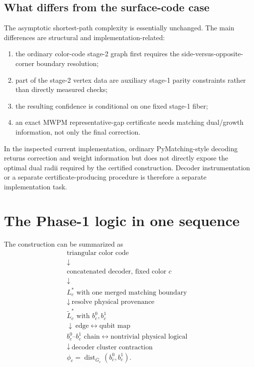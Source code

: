 \documentclass[11pt]{article}
\newcommand{\dist}{\operatorname{dist}}
\begin{document}
\subsection{What differs from the surface-code case}

The asymptotic shortest-path complexity is essentially unchanged. The main
differences are structural and implementation-related:
\begin{enumerate}
  \item the ordinary color-code stage-2 graph first requires the
        side-versus-opposite-corner boundary resolution;
  \item part of the stage-2 vertex data are auxiliary stage-1 parity
        constraints rather than directly measured checks;
  \item the resulting confidence is conditional on one fixed stage-1 fiber;
  \item an exact MWPM representative-gap certificate needs matching
        dual/growth information, not only the final correction.
\end{enumerate}

In the inspected current implementation, ordinary PyMatching-style decoding
returns correction and weight information but does not directly expose the
optimal dual radii required by the certified construction. Decoder
instrumentation or a separate certificate-producing procedure is therefore a
separate implementation task.

\section{The Phase-1 logic in one sequence}

The construction can be summarized as
\[
\boxed{
\begin{array}{c}
\text{triangular color code}\\[1mm]
\downarrow\\
\text{concatenated decoder, fixed color }c\\[1mm]
\downarrow\\
L_c^*\text{ with one merged matching boundary}\\[1mm]
\downarrow\ \text{resolve physical provenance}\\
\widetilde L_c^*\text{ with }b_c^0,b_c^1\\[1mm]
\downarrow\ \text{edge}\leftrightarrow\text{qubit map}\\
b_c^0\text{--}b_c^1\text{ chain}
\leftrightarrow
\text{nontrivial physical logical}\\[1mm]
\downarrow\ \text{decoder cluster contraction}\\
\phi_c=\dist_{\bar G_c}(b_c^0,b_c^1).
\end{array}}
\]
\end{document}
